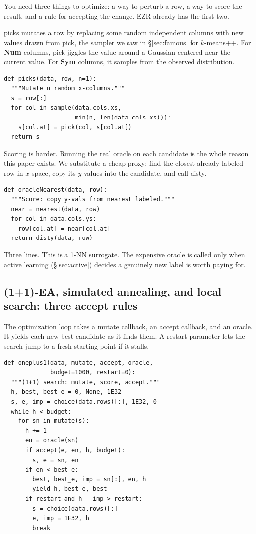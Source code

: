 \documentclass[AMA,STIX2COL]{WileyNJDv5}
\newcommand{\IT}{{\sffamily EZR}}
\newcommand{\cls}[1]{%
  \setlength{\fboxsep}{1.5pt}%
  \colorbox{clsbg}{\sffamily\bfseries{#1}}%
}
\begin{document}
You need three things to optimize: a way to perturb a row, a way
to score the result, and a rule for accepting the change. \IT{}
already has the first two.

\textsf{picks} mutates a row by replacing some random independent
columns with new values drawn from \textsf{pick}, the sampler we
saw in \S\ref{sec:famous} for $k$-means++. For \cls{Num} columns,
\textsf{pick} jiggles the value around a Gaussian centered near
the current value. For \cls{Sym} columns, it samples from the
observed distribution.

\begin{verbatim}
def picks(data, row, n=1):
  """Mutate n random x-columns."""
  s = row[:]
  for col in sample(data.cols.xs,
                    min(n, len(data.cols.xs))):
    s[col.at] = pick(col, s[col.at])
  return s
\end{verbatim}

Scoring is harder. Running the real oracle on each candidate is
the whole reason this paper exists. We substitute a cheap
proxy: find the closest already-labeled row in $x$-space, copy
its $y$ values into the candidate, and call \textsf{disty}.

\begin{verbatim}
def oracleNearest(data, row):
  """Score: copy y-vals from nearest labeled."""
  near = nearest(data, row)
  for col in data.cols.ys:
    row[col.at] = near[col.at]
  return disty(data, row)
\end{verbatim}

Three lines. This is a 1-NN surrogate. The expensive oracle is
called only when active learning (\S\ref{sec:active}) decides a
genuinely new label is worth paying for.

\subsection{(1+1)-EA, simulated annealing, and local search:
three accept rules}

The optimization loop takes a mutate callback, an accept
callback, and an oracle. It yields each new best candidate as it
finds them. A \textsf{restart} parameter lets the search jump to
a fresh starting point if it stalls.

\begin{verbatim}
def oneplus1(data, mutate, accept, oracle,
             budget=1000, restart=0):
  """(1+1) search: mutate, score, accept."""
  h, best, best_e = 0, None, 1E32
  s, e, imp = choice(data.rows)[:], 1E32, 0
  while h < budget:
    for sn in mutate(s):
      h += 1
      en = oracle(sn)
      if accept(e, en, h, budget):
        s, e = sn, en
      if en < best_e:
        best, best_e, imp = sn[:], en, h
        yield h, best_e, best
      if restart and h - imp > restart:
        s = choice(data.rows)[:]
        e, imp = 1E32, h
        break
\end{verbatim}
\end{document}
